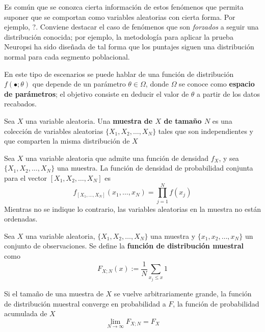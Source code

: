 Es común que se conozca cierta información de estos fenómenos que permita suponer que se comportan como variables aleatorias con cierta forma. Por ejemplo, ?.%
%
Conviene destacar el caso de fenómenos que son \textit{forzados} a seguir una distribución conocida; por ejemplo, la metodología para aplicar la prueba Neuropsi \cite{Ostrosky00} ha sido diseñada de tal forma que los puntajes siguen una distribución normal para cada segmento poblacional.

En este tipo de escenarios se puede hablar de una función de distribución $f(\bullet; \theta)$ que depende de un parámetro $\theta \in \Omega$, donde $\Omega$ se conoce como \textbf{espacio de parámetros}; el objetivo consiste en deducir el valor de $\theta$ a partir de los datos recabados.

\begin{definicion}
Sea $X$ una variable aleatoria. Una \textbf{muestra de $X$ de tamaño $N$} es una colección de variables aleatorias $\{ X_1, X_2, \dots, X_N \}$ tales que son independientes y que comparten la misma distribución de $X$
\end{definicion}

\begin{proposicion}
Sea $X$ una variable aleatoria que admite una función de densidad $f_X$, y sea $\{ X_1, X_2, \dots, X_N \}$ una muestra. La función de densidad de probabilidad conjunta para el vector $[ X_1, X_2, \dots, X_N ]$ es
\begin{equation}
f_{[ X_1, \dots, X_N ]}(x_1, \dots, x_N ) = \prod_{j=1}^{N} f(x_j)
\end{equation}
Mientras no se indique lo contrario, las variables aleatorias en la muestra no están ordenadas.
\end{proposicion}

\begin{proposicion}
Sea $X$ una variable aleatoria, $\{ X_1, X_2, \dots, X_N \}$ una muestra y $\{ x_1, x_2, \dots, x_N \}$ un conjunto de observaciones. Se define la \textbf{función de distribución muestral} como
\begin{equation}
F_{X; N} (x) := \frac{1}{N} \sum_{x_j \leq x } 1
\end{equation}
\end{proposicion}

\begin{proposicion}
Si el tamaño de una muestra de $X$ se vuelve arbitrariamente grande, la función de distribución muestral converge en probabilidad a $F$, la función de probabilidad acumulada de $X$
\begin{equation}
\lim_{N \rightarrow \infty} F_{X; N} = F_X
\end{equation}
\end{proposicion}

